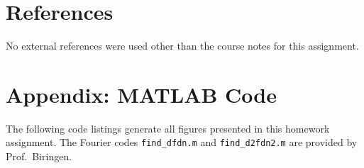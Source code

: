 \documentclass[11pt]{article}
\begin{document}
\section{References} %

No external references were used other than the course notes for this assignment.

\section*{Appendix: MATLAB Code} %

The following code listings generate all figures presented in this homework assignment. The Fourier codes \lstinline|find_dfdn.m| and \lstinline|find_d2fdn2.m| are provided by Prof.\ Biringen.


\end{document}
